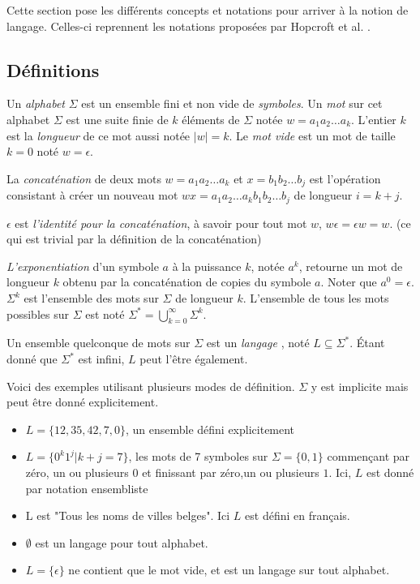 Cette section pose les différents concepts et notations pour arriver à la notion de langage. Celles-ci reprennent les notations proposées par Hopcroft et al. \cite{Hopcroft00}.



\subsection{Définitions}

Un \emph{alphabet} $\Sigma$ est un ensemble fini et non vide de \emph{symboles}. Un \emph{mot} sur cet alphabet $\Sigma$ est une suite finie de $k$ éléments de $\Sigma$ notée $ w = a_1a_2\dots a_k $. L'entier $k$ est la \emph{longueur} de ce mot aussi notée $|w|=k$. Le \emph{mot vide} est un mot de taille $k=0$ noté $w=\epsilon$.

La \emph{concaténation} de deux mots $w=a_1a_2\dots a_k$ et $x=b_1b_2\dots b_j$ est l'opération consistant à créer un nouveau mot $wx=a_1a_2\dots a_kb_1b_2\dots b_j$ de longueur $i=k+j$.

\begin{proposition}
$\epsilon$ est \emph{l'identité pour la concaténation}, à savoir pour tout mot $w$, $w\epsilon = \epsilon w = w$. (ce qui est trivial par la définition de la concaténation)
\end{proposition}

\emph{L'exponentiation} d'un symbole $a$ à la puissance $k$, notée $a^k$, retourne un mot de longueur $k$ obtenu par la concaténation de copies du symbole $a$. Noter que $a^0=\epsilon$. $\Sigma^k$ est l'ensemble des mots sur $\Sigma$ de longueur $k$. L'ensemble de tous les mots possibles sur $\Sigma$ est noté $\Sigma^* = \bigcup_{k=0}^{\infty}\Sigma^k$.


Un ensemble quelconque de mots sur $\Sigma$ est un \emph{langage} \cite{Hopcroft00}, noté $L \subseteq \Sigma^*$. Étant donné que $\Sigma^*$ est infini, $L$ peut l'être également.

\begin{example} Voici des exemples utilisant plusieurs modes de définition. $\Sigma$ y est implicite mais peut être donné explicitement.
	\begin{itemize}
		\item $L=\{12,35,42,7,0\}$, un ensemble défini explicitement
		\item $L=\{0^k1^j|k+j=7\}$, les mots de 7 symboles sur $\Sigma=\{0,1\}$ commençant par zéro, un ou plusieurs $0$ et finissant par zéro,un ou plusieurs $1$. Ici, $L$ est donné par notation ensembliste
		\item L est "Tous les noms de villes belges". Ici $L$ est défini en français.
		\item $\emptyset$ est un langage pour tout alphabet.
		\item $L=\{\epsilon\}$ ne contient que le mot vide, et est un langage sur tout alphabet.
	\end{itemize}
\end{example}


